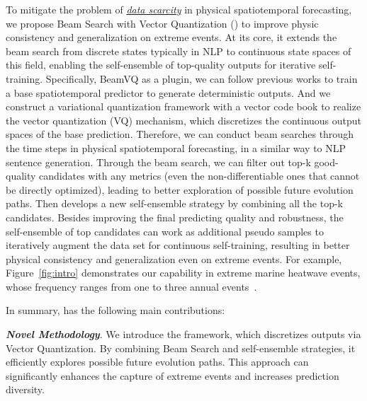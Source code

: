 To mitigate the problem of \underline{\textit{data scarcity}} in physical spatiotemporal forecasting, 
we propose Beam Search with Vector Quantization (\textbf{\method{}}) to improve physic consistency and generalization on extreme events.
At its core, it extends the beam search from discrete states typically in NLP to continuous state spaces of this field, enabling the self-ensemble of top-quality outputs for iterative self-training. 
Specifically, BeamVQ as a plugin, we can follow previous works to train a base spatiotemporal predictor to generate deterministic outputs. And we construct a variational quantization framework with a vector code book to realize the vector quantization (VQ) mechanism, which discretizes the continuous output spaces of the base prediction. Therefore, we can conduct beam searches through the time steps in physical spatiotemporal forecasting, in a similar way to NLP sentence generation. Through the beam search, we can filter out top-k good-quality candidates with any metrics (even the non-differentiable ones that cannot be directly optimized), leading to better exploration of possible future evolution paths.  Then \method{} develops a new self-ensemble strategy by combining all the top-k candidates. Besides improving the final predicting quality and robustness, the self-ensemble of top candidates can work as additional pseudo samples to iteratively augment the data set for continuous self-training, 
resulting in better physical consistency and generalization even on extreme events.
For example, Figure~\ref{fig:intro} demonstrates our capability in extreme marine heatwave events, whose frequency ranges from one to three annual events~\cite{oliver2018longer}. 

In summary, \method{} has the following main contributions:

\textit{\textbf{Novel Methodology}}. We introduce the \method{} framework, which discretizes outputs via Vector Quantization. By combining Beam Search and self-ensemble strategies, it efficiently explores possible future evolution paths. This approach can significantly enhances the capture of extreme events and increases prediction diversity.

